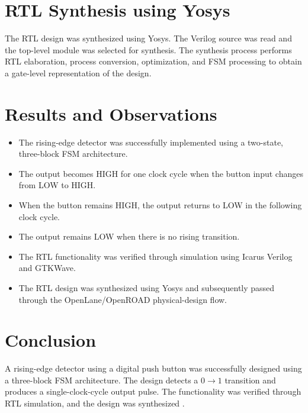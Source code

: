 \documentclass[12pt,a4paper]{report}
\begin{document}
\section{RTL Synthesis using Yosys}

The RTL design was synthesized using Yosys. The Verilog source was read and the top-level module was selected for synthesis. The synthesis process performs RTL elaboration, process conversion, optimization, and FSM processing to obtain a gate-level representation of the design.



\section{Results and Observations}

\begin{itemize}
    \item The rising-edge detector was successfully implemented using a two-state, three-block FSM architecture.
    
    \item The output becomes HIGH for one clock cycle when the button input changes from LOW to HIGH.
    
    \item When the button remains HIGH, the output returns to LOW in the following clock cycle.
    
    \item The output remains LOW when there is no rising transition.
    
    \item The RTL functionality was verified through simulation using Icarus Verilog and GTKWave.
    
    \item The RTL design was synthesized using Yosys and subsequently passed through the OpenLane/OpenROAD physical-design flow.
\end{itemize}

\section{Conclusion}

A rising-edge detector using a digital push button was successfully designed using a three-block FSM architecture. The design detects a $0\rightarrow1$ transition and produces a single-clock-cycle output pulse. The functionality was verified through RTL simulation, and the design was synthesized .
\end{document}
